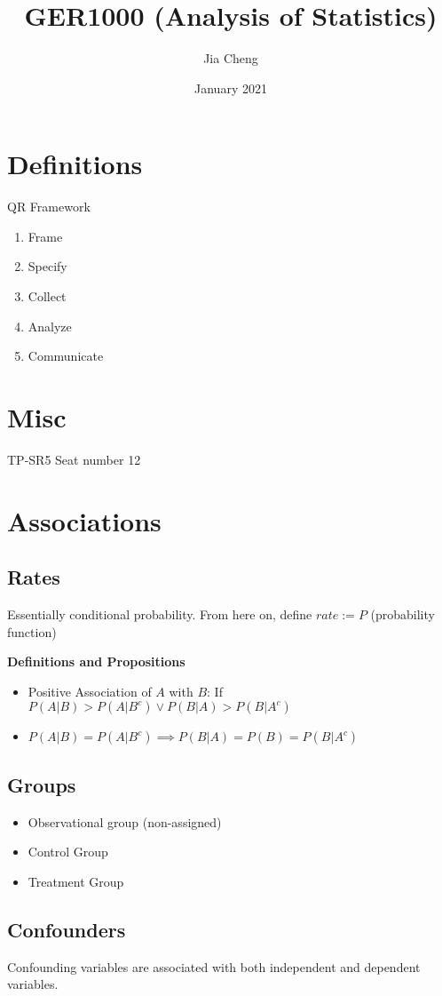 \documentclass{article}
\title{GER1000 (Analysis of Statistics)}
\author{Jia Cheng}
\date{January 2021}
\begin{document}
\maketitle

\section{Definitions}
QR Framework
\begin{enumerate}
	\item Frame 
	\item Specify 
	\item Collect 
	\item Analyze 
	\item Communicate
\end{enumerate}

\section{Misc}
TP-SR5
Seat number 12

\section{Associations}
\subsection{Rates}
Essentially conditional probability.
From here on, define $rate:=P$ (probability function)

\textbf{Definitions and Propositions
}\begin{itemize}
	\item Positive Association of $A$ with $B$: If $P(A|B) > P(A|B^c) \lor P(B|A) > P(B|A^c)$
	\item $P(A|B) = P(A|B^c) \implies P(B|A) = P(B) = P(B|A^c)$
\end{itemize}

\subsection{Groups}
\begin{itemize}
	\item Observational group (non-assigned)
	\item Control Group
	\item Treatment Group
\end{itemize}

\subsection{Confounders}
Confounding variables are associated with both independent and dependent variables.
\end{document}
